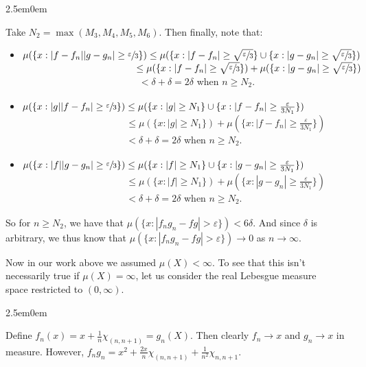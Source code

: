\documentclass{book}
\newcommand{\exPP}{%
   \color{RedViolet}%
   \fontsize{12}{14}\selectfont%
}
\newenvironment{myIndent}{%
   \begin{adjustwidth}{2.5em}{0em}%
}{%
   \end{adjustwidth}%
}
\newcommand{\retTwo}{\hfill\bigbreak}
\begin{document}
\begin{enumerate}
\begin{myIndent}
		Take $N_2 = \max(M_3, M_4, M_5, M_6)$. Then finally, note that:
		{\begin{itemize}\exPP
			\item $\mu(\{x : |f - f_n||g - g_n| \geq \sfrac{\varepsilon}{3}\}) \leq \mu(\{x : |f - f_n| \geq \sqrt{\sfrac{\varepsilon}{3}}\} \cup \{x : |g - g_n| \geq \sqrt{\sfrac{\varepsilon}{3}}\})$\\ [3pt]
			$\phantom{\mu(\{x : |f - f_n||g - g_n| \geq\})} \leq \mu(\{x : |f - f_n| \geq \sqrt{\sfrac{\varepsilon}{3}}\}) + \mu (\{x : |g - g_n| \geq \sqrt{\sfrac{\varepsilon}{3}}\})$\\ [3pt]
			$\phantom{\mu(\{x : |f - f_n||g - g_n| \geq\})} < \delta + \delta = 2\delta$ when $n \geq N_2$.\retTwo

			\item $\mu(\{x : |g||f - f_n| \geq \sfrac{\varepsilon}{3}\}) \leq \mu(\{x : |g| \geq N_1\} \cup \{x : |f - f_n| \geq \frac{\varepsilon}{3N_1}\})$\\ [3pt]
			$\phantom{\mu(\{x : |f - f_n||g - g_n| \})} \leq \mu(\{x : |g| \geq N_1 \}) + \mu (\{x : |f - f_n| \geq \frac{\varepsilon}{3N_1}\})$\\ [3pt]
			$\phantom{\mu(\{x : |f - f_n||g - g_n|\})} < \delta + \delta = 2\delta$ when $n \geq N_2$.\newpage

			\item $\mu(\{x : |f||g - g_n| \geq \sfrac{\varepsilon}{3}\}) \leq \mu(\{x : |f| \geq N_1\} \cup \{x : |g - g_n| \geq \frac{\varepsilon}{3N_1}\})$\\ [3pt]
			$\phantom{\mu(\{x : |f - f_n||g - g_n| \})} \leq \mu(\{x : |f| \geq N_1 \}) + \mu (\{x : |g - g_n| \geq \frac{\varepsilon}{3N_1}\})$\\ [3pt]
			$\phantom{\mu(\{x : |f - f_n||g - g_n|\})} < \delta + \delta = 2\delta$ when $n \geq N_2$.\retTwo
		\end{itemize}}

		So for $n \geq N_2$, we have that $\mu(\{x : |f_ng_n - fg| > \varepsilon\}) < 6\delta$. And since $\delta$ is arbitrary, we thus know that $\mu(\{x : |f_ng_n - fg| > \varepsilon\})\rightarrow 0$ as $n \rightarrow \infty$.\retTwo\retTwo


		Now in our work above we assumed $\mu(X) < \infty$. To see that this isn't\\ necessarily true if $\mu(X) = \infty$, let us consider the real Lebesgue measure\\ space restricted to $(0, \infty)$.

		\begin{myIndent}
			Define $f_n(x) = x + \frac{1}{n}\chi_{(n, n+1)} = g_n(X)$. Then clearly $f_n \rightarrow x$ and $g_n \rightarrow x$ in measure. However, $f_ng_n = x^2 + \frac{2x}{n}\chi_{(n, n+1)} + \frac{1}{n^2}\chi_{n, n+1}$.\retTwo
			

\end{myIndent}
\end{myIndent}
\end{enumerate}
\end{document}
